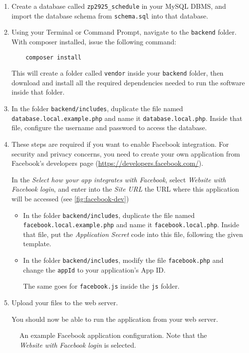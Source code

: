 \begin{enumerate}
  \item
    Create a database called \texttt{zp2925\_schedule} in your MySQL DBMS,
    and import the database schema from \texttt{schema.sql} into that database.
  \item
    Using your Terminal or Command Prompt,
    navigate to the \texttt{backend} folder.
    With composer installed, issue the following command:

    \begin{verbatim}    composer install\end{verbatim}

    This will create a folder called \texttt{vendor} inside your \texttt{backend} folder,
    then download and install all the required dependencies needed to run the software inside that folder.
  \item
    In the folder \texttt{backend/includes},
    duplicate the file named \texttt{database.local.example.php}
    and name it \texttt{database.local.php}.
    Inside that file,
    configure the username and password to access the database.
  \item
    These steps are required if you want to enable Facebook integration.
    For security and privacy concerns,
    you need to create your own application
    from Facebook's developers page (\url{https://developers.facebook.com/}).

    In the \emph{Select how your app integrates with Facebook},
    select \emph{Website with Facebook login},
    and enter into the \emph{Site URL} the URL where this application will be accessed (see \autoref{fig:facebook-dev})

    \begin{itemize}
      \item
        In the folder \texttt{backend/includes},
        duplicate the file named \texttt{facebook.local.example.php}
        and name it \texttt{facebook.local.php}.
        Inside that file,
        put the \emph{Application Secret} code into this file,
        following the given template.
      \item
        In the folder \texttt{backend/includes},
        modify the file \texttt{facebook.php}
        and change the \texttt{appId} to your application's App ID.

        The same goes for \texttt{facebook.js} inside the \texttt{js} folder.
    \end{itemize}
  \item
    Upload your files to the web server.

    You should now be able to run the application from your web server.
\end{enumerate}

\begin{figure}[t!]
  \centering{}
  \caption{An example Facebook application configuration.
    Note that the \emph{Website with Facebook login} is selected.}
  \label{fig:facebook-dev}
\end{figure}













